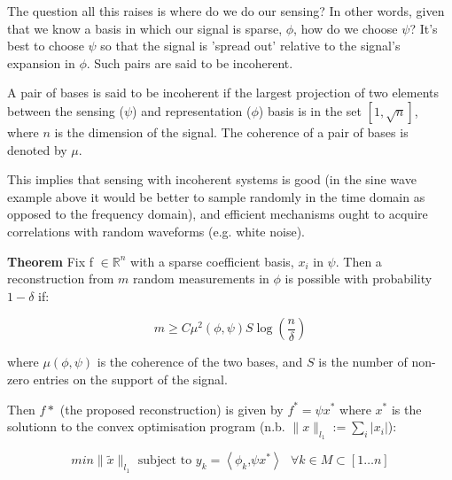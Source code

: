 

The question all this raises is where do we do our sensing? In other words, given that we know a basis in which our signal is sparse, \(\phi\), how do we choose \(\psi\)? It's best to choose \(\psi\) so that the signal is 'spread out' relative to the signal's expansion in \(\phi\). Such pairs are said to be incoherent. 

\begin{defn}
A pair of bases is said to be incoherent if the largest projection of two elements between the sensing (\(\psi\)) and representation (\(\phi\)) basis  is in the set \( [1 , \sqrt{n}] \), where \( n \) is the dimension of the signal. The coherence of a pair of bases is denoted by \(\mu\).
\end{defn}

This implies that sensing with incoherent systems is good (in the sine wave example above it would be better to sample randomly in the time domain as opposed to the frequency domain), and efficient mechanisms ought to acquire correlations with random waveforms (e.g. white noise).

\textbf{Theorem} \cite{Candes2006}
Fix f \(\in \mathbb{R}^n\) with a sparse coefficient basis, \(x_{i}\) in \(\psi\). Then a reconstruction from \(m\) random measurements in \(\phi\) is possible with probability \(1 - \delta\) if: 

\begin{equation}
m \geq C \mu^2(\phi, \psi) S \log\left(\frac{n}{\delta}\right)
\end{equation}
\label{minsamples}

where \( \mu(\phi, \psi)\) is the coherence of the two bases, and \(S\) is the number of non-zero entries on the support of the signal.

Then \(f*\) (the proposed reconstruction) is given by \(f^* = \psi x^*\) where \(x^*\) is the solutionn to the convex optimisation program (n.b. \(\| x\|_{l_{1}} := \sum_{i} |x_{i}| \)):

\begin{equation}
min\|\tilde{x}\|_{l_{1}} \text{ subject to } y_{k} = \left\langle \phi_{k} \text{,} \psi x^* \right\rangle \text{   } \forall k \in M \subset [1 \ldots n]
\end{equation}
\label{program0}

